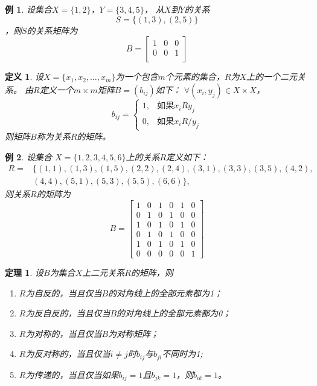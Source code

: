 \documentclass{article}
\newtheorem{Def}{定义}
\newtheorem{Thm}{定理}
\newtheorem{Example}{例}
\begin{document}
\begin{CJK*}{UTF8}{gbsn}
  \begin{Example}
    设集合$X=\{1,2\}$，$Y=\{3,4,5\}$， 从$X$到$Y$的关系\[S=\{(1,3), (2, 5)\}\]，则$S$的关系矩阵为
    \[B=\begin{bmatrix}
      1&0&0\\
      0&0&1\\
    \end{bmatrix}
  \]
  \end{Example}
  \begin{Def}
    设$X=\{x_1, x_2, \ldots, x_m\}$为一个包含$m$个元素的集合，$R$为$X$上的一个二元关系。
    由$R$定义一个$m \times m$矩阵$B = (b_{ij})$如下： $\forall (x_i, y_j) \in X \times X$，
\[
    b_{ij}=
      \begin{cases}
        1,&\text{如果}x_iRy_j\\
        0,&\text{如果}x_iR\!\!\! / y_j
      \end{cases}
\]
    则矩阵$B$称为关系$R$的矩阵。
  \end{Def}
  
  \begin{Example}
    设集合
    $X=\{1,2,3,4,5,6 \}$上的关系$R$定义如下：
    \begin{align*}
      R=&\{(1,1),(1,3),(1,5),(2,2),(2,4),(3,1),(3,3),(3,5),(4,2),\\
      &(4,4),(5,1),(5,3),(5,5),(6,6)\},
    \end{align*}
    则关系$R$的矩阵为
    \[B=\begin{bmatrix}
      1&0&1&0&1&0\\
      0&1&0&1&0&0\\
      1&0&1&0&1&0\\
      0&1&0&1&0&0\\
      1&0&1&0&1&0\\
      0&0&0&0&0&1
    \end{bmatrix}
  \]
  \end{Example}

  \begin{Thm}
  设$B$为集合$X$上二元关系$R$的矩阵，则
  \begin{enumerate}
  \item $R$为自反的，当且仅当$B$的对角线上的全部元素都为1；
  \item $R$为反自反的，当且仅当$B$的对角线上的全部元素都为0；
  \item $R$为对称的，当且仅当$B$为对称矩阵；
  \item $R$为反对称的，当且仅当$i \neq j$时$b_{ij}$与$b_{ji}$不同时为1;
  \item $R$为传递的，当且仅当如果$b_{ij}=1$且$b_{jk}=1$，则$b_{ik}=1$。
  \end{enumerate}
\end{Thm}



\end{CJK*}
\end{document}
